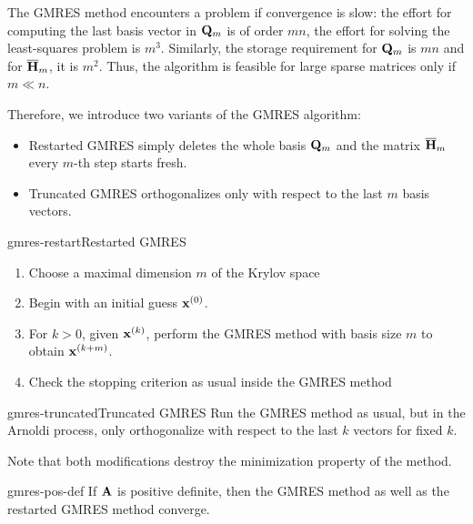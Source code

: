 \begin{remark}
  The GMRES method encounters a problem if convergence is slow: the
  effort for computing the last basis vector in $\mathbf Q_m$ is of order
  $mn$, the effort for solving the least-squares problem is
  $m^3$. Similarly, the storage requirement for $\mathbf Q_m$ is $mn$ and
  for $\overline {\mathbf H}_m$, it is $m^2$. Thus, the algorithm is
  feasible for large sparse matrices only if $m\ll n$.

  Therefore, we introduce two variants of the GMRES algorithm:
  \begin{itemize}
  \item Restarted GMRES simply deletes the whole basis $\mathbf Q_m$ and the matrix $\overline{\mathbf H}_m$ every $m$-th step starts fresh.
  \item Truncated GMRES orthogonalizes only with respect to the last
    $m$ basis vectors.
  \end{itemize}
\end{remark}

\begin{Algorithm*}{gmres-restart}{Restarted GMRES}
  \begin{enumerate}
  \item Choose a maximal dimension $m$ of the Krylov space
  \item Begin with an initial guess $\mathbf x^{(0)}$.
  \item For $k>0$, given $\mathbf x^{(k)}$, perform the GMRES method with
    basis size $m$ to obtain $\mathbf x^{(k+m)}$.
  \item Check the stopping criterion as usual inside the GMRES method
  \end{enumerate}
\end{Algorithm*}

\begin{Algorithm*}{gmres-truncated}{Truncated GMRES}
  Run the GMRES method as usual, but in the Arnoldi process, only
  orthogonalize with respect to the last $k$ vectors for fixed $k$.
\end{Algorithm*}

\begin{remark}
  Note that both modifications destroy the minimization property of the method.
\end{remark}

\begin{Theorem}{gmres-pos-def}
  If $\mathbf A$ is positive definite, then the GMRES method as well as
  the restarted GMRES method converge.
\end{Theorem}

